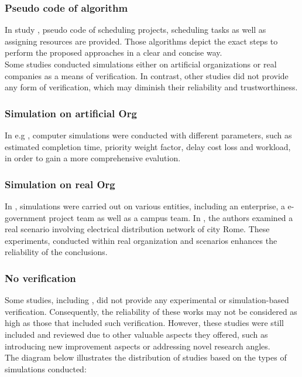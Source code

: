 \documentclass[runningheads]{llncs}
\begin{document}
\subsubsection{Pseudo code of algorithm}
In study \cite{study7}, pseudo code of scheduling projects, scheduling tasks as well as assigning resources are provided. Those algorithms depict the exact steps to perform the proposed approaches in a clear and concise way.\\
\newline
\newline
Some studies conducted simulations either on artificial organizations\cite{study4,study7,study8,study13,study14,study19} or real companies\cite{study1,study11,study15,study18} as a means of verification. In contrast, other studies did not provide any form of verification, which may diminish their reliability and trustworthiness.

\subsubsection{Simulation on artificial Org}
In e.g \cite{study14}, computer simulations were conducted with different parameters, such as estimated completion time, priority weight factor, delay cost loss and workload, in order to gain a more comprehensive evalution. 
\subsubsection{Simulation on real Org}
In \cite{study5}, simulations were carried out on various entities, including an enterprise, a e-government project team as well as a campus team. In \cite{study1}, the authors examined a real scenario involving electrical distribution network of city Rome. These experiments, conducted within real organization and scenarios enhances the reliability of the conclusions.
\subsubsection{No verification}
Some studies, including \cite{study16}, did not provide any experimental or simulation-based verification. Consequently, the reliability of these works may not be considered as high as those that included such verification. However, these studies were still included and reviewed due to other valuable aspects they offered, such as introducing new improvement aspects or addressing novel research angles.\\
The diagram below illustrates the distribution of studies based on the types of simulations conducted:
\begin{figure}[H]
\end{figure}
\end{document}
